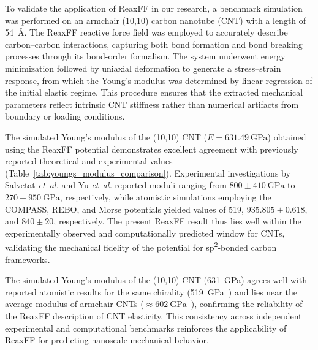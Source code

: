 \documentclass[journal=jacsat,manuscript=article]{achemso}
\begin{document}
To validate the application of ReaxFF in our research, a benchmark simulation was performed on an armchair (10,10) carbon nanotube (CNT) with a length of 54~\AA{}. The ReaxFF reactive force field was employed to accurately describe carbon–carbon interactions, capturing both bond formation and bond breaking processes through its bond-order formalism. The system underwent energy minimization followed by uniaxial deformation to generate a stress–strain response, from which the Young’s modulus was determined by linear regression of the initial elastic regime. This procedure ensures that the extracted mechanical parameters reflect intrinsic CNT stiffness rather than numerical artifacts from boundary or loading conditions.

The simulated Young’s modulus of the (10,10) CNT (\(E = 631.49~\mathrm{GPa}\)) obtained using the ReaxFF potential demonstrates excellent agreement with previously reported theoretical and experimental values (Table~\ref{tab:youngs_modulus_comparison}). Experimental investigations by Salvetat \textit{et~al.}\cite{salvetat1999elastic} and Yu \textit{et~al.}\cite{yu2000strength} reported moduli ranging from \(800 \pm 410~\mathrm{GPa}\) to \(270{-}950~\mathrm{GPa}\), respectively, while atomistic simulations employing the COMPASS,\cite{sharma2013molecular} REBO,\cite{wenxing2004simulation} and Morse\cite{lu2005effect} potentials yielded values of 519, $935.805 \pm 0.618$, and $840 \pm 20$, respectively. The present ReaxFF result thus lies well within the experimentally observed and computationally predicted window for CNTs, validating the mechanical fidelity of the potential for sp\textsuperscript{2}-bonded carbon frameworks.

The simulated Young’s modulus of the (10,10) CNT (631~GPa) agrees well with reported atomistic results for the same chirality (519~GPa~\cite{sharma2013molecular}) and lies near the average modulus of armchair CNTs (\(\approx 602~\mathrm{GPa}\)~\cite{sharma2013molecular}), confirming the reliability of the ReaxFF description of CNT elasticity. This consistency across independent experimental and computational benchmarks reinforces the applicability of ReaxFF for predicting nanoscale mechanical behavior.
\end{document}
